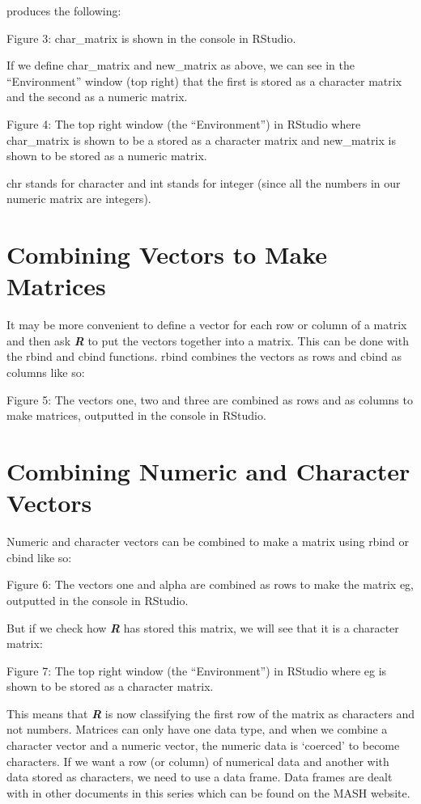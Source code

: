 \documentclass[
]{book}
\begin{document}
produces the following:

Figure 3: char\_matrix is shown in the console in RStudio.

If we define char\_matrix and new\_matrix as above, we can see in the ``Environment'' window (top right) that the first is stored as a character matrix and the second as a numeric matrix.

Figure 4: The top right window (the ``Environment'') in RStudio where char\_matrix is shown to be a stored as a character matrix and new\_matrix is shown to be stored as a numeric matrix.

chr stands for character and int stands for integer (since all the numbers in our numeric matrix are integers).

\section{Combining Vectors to Make Matrices}\label{combining-vectors-to-make-matrices}

It may be more convenient to define a vector for each row or column of a matrix and then ask \textbf{\emph{R}} to put the vectors together into a matrix. This can be done with the rbind and cbind functions. rbind combines the vectors as rows and cbind as columns like so:

Figure 5: The vectors one, two and three are combined as rows and as columns to make matrices, outputted in the console in RStudio.

\section{Combining Numeric and Character Vectors}\label{combining-numeric-and-character-vectors}

Numeric and character vectors can be combined to make a matrix using rbind or cbind like so:

Figure 6: The vectors one and alpha are combined as rows to make the matrix eg, outputted in the console in RStudio.

But if we check how \textbf{\emph{R}} has stored this matrix, we will see that it is a character matrix:

Figure 7: The top right window (the ``Environment'') in RStudio where eg is shown to be stored as a character matrix.

This means that \textbf{\emph{R}} is now classifying the first row of the matrix as characters and not numbers. Matrices can only have one data type, and when we combine a character vector and a numeric vector, the numeric data is `coerced' to become characters. If we want a row (or column) of numerical data and another with data stored as characters, we need to use a data frame. Data frames are dealt with in other documents in this series which can be found on the MASH website.
\end{document}
